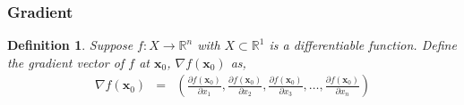 \documentclass{beamer}
\newtheorem{thm}{Theorem}
\newtheorem{defn}{Definition}
\numberwithin{equation}{section}
\begin{document}







\begin{frame}
\frametitle{Gradient} 

\begin{defn} 
Suppose $f:X \rightarrow \mathbb{R}^{n}$ with $X \subset \mathbb{R}^{1}$ is a differentiable function.  Define the gradient vector of $f$ at $\boldsymbol{x}_{0}$, $\nabla f(\boldsymbol{x}_{0})$ as, 
\begin{eqnarray}
\nabla f (\boldsymbol{x}_{0})  & = & \left(\frac{\partial f (\boldsymbol{x}_{0}) }{\partial x_{1} }, \frac{\partial f (\boldsymbol{x}_{0}) }{\partial x_{2} }, \frac{\partial f (\boldsymbol{x}_{0}) }{\partial x_{3} }, \hdots, \frac{\partial f (\boldsymbol{x}_{0}) }{\partial x_{n} } \right) \nonumber 
\end{eqnarray}

\end{defn}



\end{frame}
\end{document}
